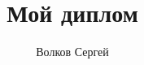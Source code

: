 \documentclass[a4paper,10pt]{report}
\title{Мой диплом}
\author{Волков Сергей}
\begin{document}
\maketitle

\begin{abstract}
\end{abstract}
\end{document}
